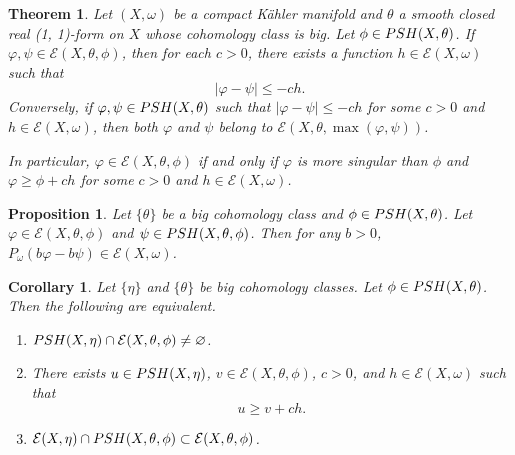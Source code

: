 \documentclass[10pt,a4paper]{amsart}
\newtheorem{theorem}{Theorem}
\newtheorem{proposition}{Proposition}
\newtheorem{corollary}{Corollary}
\newcommand{\PSH}{{\rm PSH}}
\begin{document}
\begin{theorem}\label{thm: thm1}
Let $(X, \omega)$ be a compact K\"{a}hler manifold and $\theta$ a smooth closed real (1, 1)-form on $X$ whose cohomology class is big.
Let $\phi\in\PSH(X,\theta)$. If $\varphi,\psi\in\mathcal{E}(X,\theta,\phi)$, then for each $c>0$, there exists a function $ h\in\mathcal{E}(X,\omega)$ such that $$|\varphi-\psi|\leq -ch.$$
Conversely, if $\varphi,\psi\in\PSH(X,\theta)$ such that $|\varphi-\psi|\leq -ch$ for some $c>0$ and $h\in\mathcal{E}(X,\omega)$, then both $\varphi$ and $\psi$ belong to $\mathcal{E}(X,\theta,\max(\varphi,\psi))$.

In particular, $\varphi\in\mathcal{E}(X,\theta,\phi)$ if and only if $\varphi$ is more singular than $\phi$ and $\varphi\geq \phi+ch $ for some $c>0$ and $h\in\mathcal{E}(X,\omega)$.
\end{theorem}  

\begin{proposition}\label{prop: homega}
Let $\{\theta\}$ be a big cohomology class and $\phi\in\PSH(X,\theta)$. Let $\varphi\in\mathcal{E}(X,\theta,\phi)$ and $\psi\in \PSH(X,\theta,\phi)$. Then for any $b>0$, $P_\omega(b\varphi-b\psi)\in\mathcal{E}(X,\omega)$.
\end{proposition}

\begin{corollary}
 Let $\{\eta\}$ and $\{\theta\}$ be big cohomology classes. Let $\phi\in\PSH(X,\theta)$. Then the following are equivalent.
\hfill
\begin{enumerate}
\item $\PSH(X,\eta)\cap\mathcal{E}(X,\theta,\phi)\neq \varnothing$.

\item There exists $u\in\PSH(X,\eta)$, $v\in\mathcal{E}(X,\theta,\phi)$, $c>0$, and $h\in\mathcal{E}(X,\omega)$ such that \[u\geq v+ ch. \]

\item $\mathcal{E}(X,\eta)\cap\PSH(X,\theta,\phi)\subset \mathcal{E}(X,\theta,\phi)$.
\end{enumerate}

\end{corollary}
\end{document}
